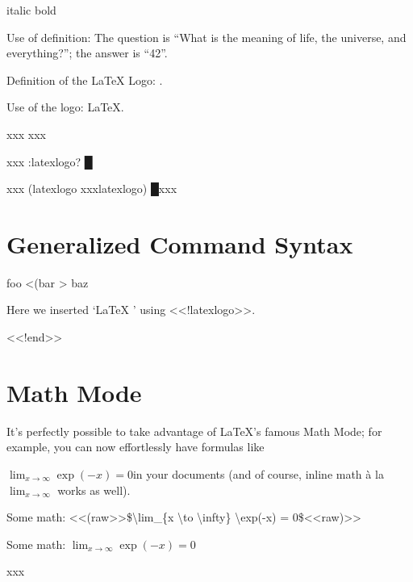 
\begin{multicols}{2}{\mktsStyleItalic{}italic\/}
{\mktsStyleBold{}bold}\mktsShowpar\par
Use of definition: The question is “{\mktsStyleItalic{}What is the meaning of life,
the universe, and everything?\/}”; the
answer is “{\mktsStyleBold{}42}”.\mktsShowpar\par
\end{multicols}Definition of the LaTeX Logo:
.\mktsShowpar\par
Use of the logo: \LaTeX{}.\mktsShowpar\par
xxx
xxx\mktsShowpar\par
xxx {\mktsStyleBold\color{violet}{\mktsStyleSymbol}:latexlogo? {\mktsStyleSymbol█}}\mktsShowpar\par
xxx {\mktsStyleBold\color{violet}{\mktsStyleSymbol█}(latexlogo {\mktsStyleSymbol}}xxx{\mktsStyleBold\color{violet}{\mktsStyleSymbol}latexlogo) {\mktsStyleSymbol█}}xxx\mktsShowpar\par

\section{Generalized Command Syntax
}
foo <{\mktsStyleBold\color{violet}{\mktsStyleSymbol█}(bar {\mktsStyleSymbol}}> baz\mktsShowpar\par
Here we inserted ‘\LaTeX{}
’ using {\mktsStyleCode{}<<!latexlogo>>}.\mktsShowpar\par
{\mktsStyleCode{}<<!end>>}\mktsShowpar\par
\begin{multicols}{2}\end{multicols}
\section{Math Mode
}
\begin{multicols}{2}It’s perfectly possible to take advantage of
\LaTeX{}'s famous Math Mode; for example,
you can now effortlessly have formulas like\mktsShowpar\par
$\lim_{x \to \infty} \exp(-x) = 0$in your documents (and of course, inline math {\mktsStyleItalic{}à la\/}
$\lim_{x \to \infty}$ works as well).\mktsShowpar\par
\end{multicols}Some math: {\mktsStyleCode{}<<(raw>>\$\textbackslash{}lim\_\{x \textbackslash{}to \textbackslash{}infty\} \textbackslash{}exp(-x) = 0\$<<raw)>>}\mktsShowpar\par
Some math: $\lim_{x \to \infty} \exp(-x) = 0$\mktsShowpar\par
xxx\mktsShowpar\par

